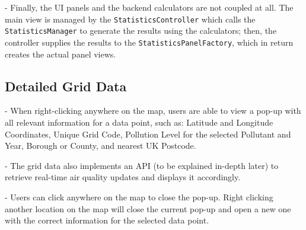 \documentclass[../main.tex]{subfiles}
\begin{document}
    - Finally, the UI panels and the backend calculators are not coupled at all. The main view is managed by the \verb|StatisticsController| which calls the \verb|StatisticsManager| to generate the results using the calculators; then, the controller supplies the results to the \verb|StatisticsPanelFactory|, which in return creates the actual panel views.

\subsection{Detailed Grid Data}
    - When right-clicking anywhere on the map, users are able to view a pop-up with all relevant information for a data point, such as: Latitude and Longitude Coordinates, Unique Grid Code, Pollution Level for the selected Pollutant and Year, Borough or County, and nearest UK Postcode. 
    
    - The grid data also implements an API (to be explained in-depth later) to retrieve real-time air quality updates and displays it accordingly.
    
    - Users can click anywhere on the map to close the pop-up. Right clicking another location on the map will close the current pop-up and open a new one with the correct information for the selected data point.
\end{document}
